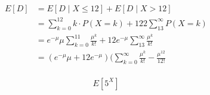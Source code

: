 \documentclass{report}
\title{}
\author{Ryan Lin}
\date{}
\begin{document}
\maketitle
\section{}


\begin{align*}
	E[D] &=  E[D \mid X \le 12] + E[D \mid X > 12] \\
	&=  \sum_{k=0}^{12}k\cdot P(X=k) + 122 \sum_{13}^{\infty }P(X=k) \\
	&= e^{-\mu }\mu \sum_{k=0}^{11} \frac{\mu^k }{k!} + 12 e^{-\mu }\sum_{13}^{\infty } \frac{\mu ^{k}}{k!} \\
	&= (e^{-\mu }\mu  + 12e^{-\mu }) (\sum_{k=0}^{\infty }\frac{\mu ^{k}}{k!} - \frac{\mu ^{12}}{12!} \\
\end{align*}


\[
E[5^{X}]
\]
\end{document}

